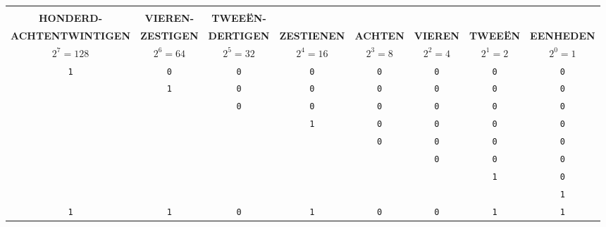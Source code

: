 \begin{center}
  \begin{tabular}{|c|c|c|c|c|c|c|c|}
  \hline
  	& & & & & & &  \\
    \small{\bf HONDERD-} & \small{\bf VIEREN-} & \small{\bf TWEEËN-} &  &  & &  & \\
    \small{\bf ACHTENTWINTIGEN} & \small{\bf ZESTIGEN} & \small{\bf DERTIGEN} & \small{\bf ZESTIENEN} & \small{\bf ACHTEN} & \small{\bf VIEREN} & \small{\bf TWEEËN} & \small{\bf EENHEDEN} \\ \hline
	  \small{$2^{7} = 128$} & \small{$2^{6} = 64$} & \small{$2^{5} = 32$} & \small{$2^{4} = 16$} & \small{$2^{3} = 8$} & \small{$2^{2} = 4$} & \small{$2^{1} = 2$} & \small{$2^{0} = 1$} \\ \hhline{|=|=|=|=|=|=|=|=|}
	  \large{\texttt{1}} & \large{\texttt{0}} & \large{\texttt{0}} & \large{\texttt{0}} & \large{\texttt{0}} & \large{\texttt{0}} & \large{\texttt{0}} & \large{\texttt{0}} \\ \hline
	            & \large{\texttt{1}} & \large{\texttt{0}} & \large{\texttt{0}} & \large{\texttt{0}} & \large{\texttt{0}} & \large{\texttt{0}} & \large{\texttt{0}} \\ \hline
	            &           & \large{\texttt{0}} & \large{\texttt{0}} & \large{\texttt{0}} & \large{\texttt{0}} & \large{\texttt{0}} & \large{\texttt{0}} \\ \hline
	            &           &           & \large{\texttt{1}} & \large{\texttt{0}} & \large{\texttt{0}} & \large{\texttt{0}} & \large{\texttt{0}} \\ \hline
	            &           &           &           & \large{\texttt{0}} & \large{\texttt{0}} & \large{\texttt{0}} & \large{\texttt{0}} \\ \hline
	            &           &           &           &           & \large{\texttt{0}} & \large{\texttt{0}} & \large{\texttt{0}} \\ \hline
	            &           &           &           &           &           & \large{\texttt{1}} & \large{\texttt{0}} \\ \hline
	  					&           &           &           &           &           &           & \large{\texttt{1}} \\ \hhline{|=|=|=|=|=|=|=|=|}
	 \Large{\texttt{1}}  & \Large{\texttt{1}}   & \Large{\texttt{0}}  & \Large{\texttt{1}}  & \Large{\texttt{0}}  & \Large{\texttt{0}}  & \Large{\texttt{1}} & \Large{\texttt{1}} \\ \hline
  \end{tabular}
\end{center}

